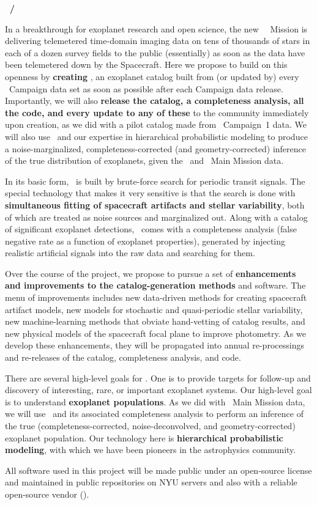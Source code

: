 \documentclass[12pt]{article}
\begin{document}
\noindent\textbf{\shortauthor~/~\fulltitle}
\bigskip

In a breakthrough for exoplanet research and open science, the new
\kepler\ \ketu\ Mission is delivering telemetered time-domain imaging
data on tens of thousands of stars in each of a dozen survey fields to
the public (essentially) as soon as the data have been telemetered
down by the Spacecraft.
Here we propose to build on this openness by \textbf{creating
  \thecatalog}, an exoplanet catalog built from (or updated by)
every \ketu\ Campaign data set as soon as possible after each Campaign
data release.
Importantly, we will also \textbf{release the catalog, a completeness
  analysis, all the code, and every update to any of these} to the
community immediately upon creation, as we did with a pilot catalog
made from \ketu\ Campaign~1 data.
We will also use \thecatalog\ and our expertise in hierarchical
probabilistic modeling to produce a noise-marginalized,
completeness-corrected (and geometry-corrected) inference of the true
distribution of exoplanets, given the \ketu\ and \kepler\ Main Mission
data.

In its basic form, \thecatalog\ is built by brute-force search for
periodic transit signals.
The special technology that makes it very sensitive is that the search
is done with \textbf{simultaneous fitting of spacecraft artifacts and stellar
variability}, both of which are treated as noise sources and
marginalized out.
Along with a catalog of significant exoplanet detections,
\thecatalog\ comes with a completeness analysis (false negative rate
as a function of exoplanet properties), generated by injecting
realistic artificial signals into the raw data and searching for them.

Over the course of the project, we propose to pursue a set of
\textbf{enhancements and improvements to the catalog-generation methods} and
software.
The menu of improvements includes new data-driven methods for creating
spacecraft artifact models, new models for stochastic and quasi-periodic
stellar variability, new machine-learning methods that obviate
hand-vetting of catalog results, and new physical models of the spacecraft
focal plane to improve photometry.
As we develop these enhancements, they will be propagated into annual
re-processings and re-releases of the catalog, completeness analysis,
and code.

There are several high-level goals for \thecatalog.
One is to provide targets for follow-up and discovery of interesting,
rare, or important exoplanet systems.
Our high-level goal is to understand \textbf{exoplanet populations}.
As we did with \kepler\ Main Mission data, we will use
\thecatalog\ and its associated completeness analysis to perform an
inference of the true (completeness-corrected, noise-deconvolved, and
geometry-corrected) exoplanet population.
Our technology here is \textbf{hierarchical probabilistic modeling},
with which we have been pioneers in the astrophysics community.

All software used in this project will be made public under an
open-source license and maintained in public 
repositories on NYU servers and also with a reliable open-source
vendor ().
\end{document}
